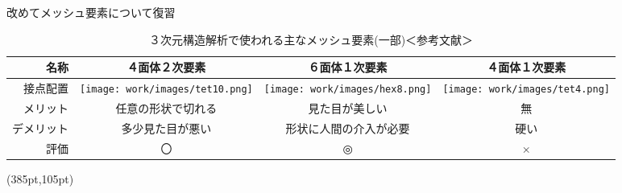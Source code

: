 \begin{frame}{改めてメッシュ要素について復習}
  \begin{table}[hbtp]
      \caption{３次元構造解析で使われる主なメッシュ要素(一部)＜参考文献\cite{handbook}＞}
      \vspace{-5mm}
      \begin{tabular}{|r|c|c|c|} %
          \hline
          名称       & ４面体２次要素 & ６面体１次要素 & ４面体１次要素 \\
          \hline
          接点配置   & \texttt{[image: work/images/tet10.png]}
                     & \texttt{[image: work/images/hex8.png]} 
                     & \texttt{[image: work/images/tet4.png]}  \\
          \hline
          メリット   & 任意の形状で切れる & 見た目が美しい & 無 \\
          \hline
          デメリット & 多少見た目が悪い   & 形状に人間の介入が必要 & 硬い \\
          \hline
          評価       &   〇               & ◎              & × \\
          \hline
    \end{tabular}
  \end{table}
  \begin{textblock*}{30pt}(385pt,105pt)
  \end{textblock*}
\end{frame}
